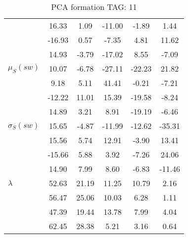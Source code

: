 \begin{table}[h!]
\begin{center}
\begin{tabular}{| l || c | c | c | c | c |}
 & 16.33  & 1.09  & -11.00  & -1.89  & 1.44 \\
 & -16.93  & 0.57  & -7.35  & 4.81  & 11.62 \\
 & 14.93  & -3.79  & -17.02  & 8.55  & -7.09 \\\hline
$\mu_S(sw)$ & 10.07  & -6.78  & -27.11  & -22.23  & 21.82 \\
 & 9.18  & 5.11  & 41.41  & -0.21  & -7.21 \\
 & -12.22  & 11.01  & 15.39  & -19.58  & -8.24 \\
 & 14.89  & 3.21  & 8.91  & -19.19  & -6.46 \\\hline
$\sigma_S(sw)$ & 15.65  & -4.87  & -11.99  & -12.62  & -35.31 \\
 & 15.56  & 5.74  & 12.91  & -3.90  & 13.41 \\
 & -15.66  & 5.88  & 3.92  & -7.26  & 24.06 \\
 & 14.90  & 7.99  & 8.60  & -6.83  & -11.46 \\\hline\hline
$\lambda$ & 52.63  & 21.19  & 11.25  & 10.79  & 2.16 \\
 & 56.47  & 25.06  & 10.03  & 6.28  & 1.11 \\
 & 47.39  & 19.44  & 13.78  & 7.99  & 4.04 \\
 & 62.45  & 28.38  & 5.21  & 3.16  & 0.64 \\\hline
\end{tabular}
\caption{PCA formation TAG: 11}
\end{center}
\end{table}